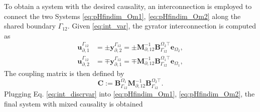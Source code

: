 To obtain a system with the desired causality, an interconnection is employed to connect the two Systems \eqref{eq:pHfindim_Om1}, \eqref{eq:pHfindim_Om2} along the shared boundary $\Gamma_{12}$. Given \eqref{eq:int_var}, the gyrator interconnection \cite{duindam2009} is computed as
\begin{equation}\label{eq:int_discrvar}
\begin{aligned}
{\mathbf{u}_{\partial, 1}^{\Gamma_{12}}} &= \pm {\mathbf{y}_{\partial, 2}^{\Gamma_{12}}}= \pm \mathbf{M}_{\partial, 12}^{-1} \mathbf{B}_{\Gamma_{12}}^{\Omega_2 \top} \mathbf{e}_{\Omega_2}, \\ {\mathbf{u}_{\partial, 2}^{\Gamma_{12}}} &= \mp {\mathbf{y}_{\partial, 1}^{\Gamma_{12}}}=\mp \mathbf{M}_{\partial, 12}^{-1} \mathbf{B}_{\Gamma_{12}}^{\Omega_1 \top} \mathbf{e}_{\Omega_1}, 
\end{aligned}
\end{equation}
The coupling matrix is then defined by 
\begin{equation}
\mathbf{C} := \mathbf{B}_{\Gamma_{12}}^{\Omega_1}\mathbf{M}_{\partial, 12}^{-1} \mathbf{B}_{\Gamma_{12}}^{\Omega_2 \top}.	
\end{equation}
Plugging Eq. \eqref{eq:int_discrvar} into \ref{eq:pHfindim_Om1}, \ref{eq:pHfindim_Om2}, the final system with mixed causality is obtained

